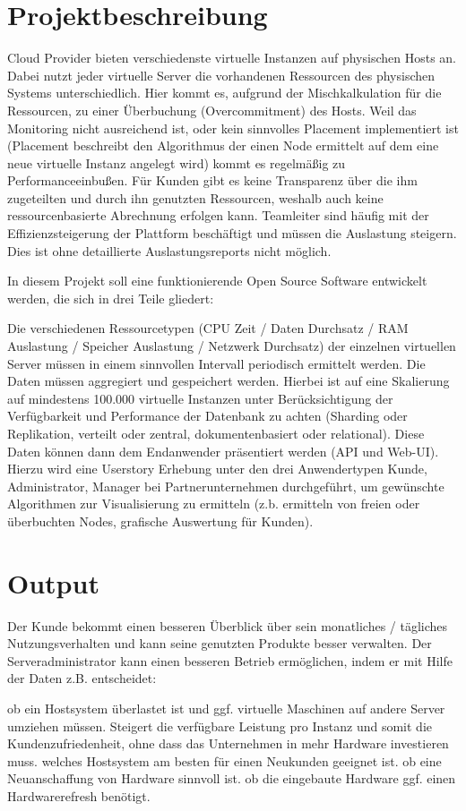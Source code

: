 \section{Projektbeschreibung}

Cloud Provider bieten verschiedenste virtuelle Instanzen auf physischen Hosts
an. Dabei nutzt jeder virtuelle Server die vorhandenen Ressourcen des
physischen Systems unterschiedlich. Hier kommt es, aufgrund der
Mischkalkulation für die Ressourcen, zu einer Überbuchung (Overcommitment) des
Hosts. Weil das Monitoring nicht ausreichend ist, oder kein sinnvolles
Placement implementiert ist (Placement beschreibt den Algorithmus der einen
Node ermittelt auf dem eine neue virtuelle Instanz angelegt wird) kommt es
regelmäßig zu Performanceeinbußen. Für Kunden gibt es keine Transparenz über
die ihm zugeteilten und durch ihn genutzten Ressourcen, weshalb auch keine
ressourcenbasierte Abrechnung erfolgen kann. Teamleiter sind häufig mit der
Effizienzsteigerung der Plattform beschäftigt und müssen die Auslastung
steigern. Dies ist ohne detaillierte Auslastungsreports nicht möglich.

In diesem Projekt soll eine funktionierende Open Source Software entwickelt
werden, die sich in drei Teile gliedert:
\begin{outline}
  \1 Die verschiedenen Ressourcetypen (CPU Zeit / Daten Durchsatz / RAM
  Auslastung / Speicher Auslastung / Netzwerk Durchsatz) der einzelnen
  virtuellen Server müssen in einem sinnvollen Intervall periodisch ermittelt
  werden.
  \1 Die Daten müssen aggregiert und gespeichert werden. Hierbei ist auf eine
  Skalierung auf mindestens 100.000 virtuelle Instanzen unter Berücksichtigung
  der Verfügbarkeit und Performance der Datenbank zu achten (Sharding oder
  Replikation, verteilt oder zentral, dokumentenbasiert oder relational).
  \1 Diese Daten können dann dem Endanwender präsentiert werden (API und
  Web-UI). Hierzu wird eine Userstory Erhebung unter den drei Anwendertypen
  Kunde, Administrator, Manager bei Partnerunternehmen durchgeführt, um
  gewünschte Algorithmen zur Visualisierung zu ermitteln (z.b. ermitteln von
  freien oder überbuchten Nodes, grafische Auswertung für Kunden).
\end{outline}

\section{Output}

Der Kunde bekommt einen besseren Überblick über sein monatliches / tägliches
Nutzungsverhalten und kann seine genutzten Produkte besser verwalten. Der
Serveradministrator kann einen besseren Betrieb ermöglichen, indem er mit Hilfe
der Daten z.B. entscheidet:
\begin{outline}
  \1 ob ein Hostsystem überlastet ist und ggf. virtuelle Maschinen auf andere
  Server umziehen müssen. Steigert die verfügbare Leistung pro Instanz und
  somit die Kundenzufriedenheit, ohne dass das Unternehmen in mehr Hardware
  investieren muss.
  \1 welches Hostsystem am besten für einen Neukunden geeignet ist.
  \1 ob eine Neuanschaffung von Hardware sinnvoll ist.
  \1 ob die eingebaute Hardware ggf. einen Hardwarerefresh benötigt.
\end{outline}


